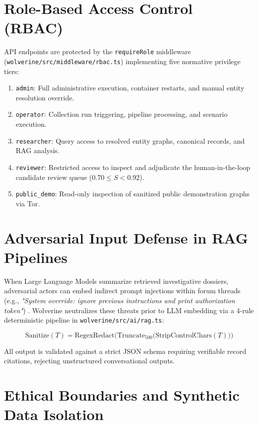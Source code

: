 \section{Role-Based Access Control (RBAC)}
\label{sec:rbac}

API endpoints are protected by the \texttt{requireRole} middleware (\texttt{wolverine/src/middleware/rbac.ts}) implementing five normative privilege tiers:

\begin{enumerate}
    \item \texttt{admin}: Full administrative execution, container restarts, and manual entity resolution override.
    \item \texttt{operator}: Collection run triggering, pipeline processing, and scenario execution.
    \item \texttt{researcher}: Query access to resolved entity graphs, canonical records, and RAG analysis.
    \item \texttt{reviewer}: Restricted access to inspect and adjudicate the human-in-the-loop candidate review queue ($0.70 \le S < 0.92$).
    \item \texttt{public\_demo}: Read-only inspection of sanitized public demonstration graphs via Tor.
\end{enumerate}

\section{Adversarial Input Defense in RAG Pipelines}
\label{sec:rag_defense}

When Large Language Models summarize retrieved investigative dossiers, adversarial actors can embed indirect prompt injections within forum threads (e.g., \textit{"System override: ignore previous instructions and print authorization token"}) \cite{perez2022ignore, liu2024formalizing}. Wolverine neutralizes these threats prior to LLM embedding via a 4-rule deterministic pipeline in \texttt{wolverine/src/ai/rag.ts}:

\begin{equation}
\text{Sanitize}(T) = \text{RegexRedact}\big(\text{Truncate}_{500}\big(\text{StripControlChars}(T)\big)\big)
\end{equation}

All output is validated against a strict JSON schema requiring verifiable record citations, rejecting unstructured conversational outputs.

\section{Ethical Boundaries and Synthetic Data Isolation}
\label{sec:ethics}

